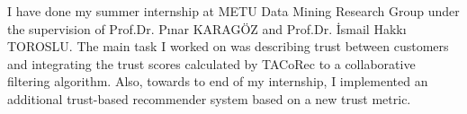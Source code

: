 I have done my summer internship at METU Data Mining Research Group under the supervision of Prof.Dr. Pınar KARAGÖZ and Prof.Dr. İsmail Hakkı TOROSLU. The main task I worked on was describing trust between customers and integrating the trust scores calculated by TACoRec\cite{Tacorec} to a collaborative filtering algorithm. Also, towards to end of my internship, I implemented an additional trust-based recommender system based on a new trust metric.